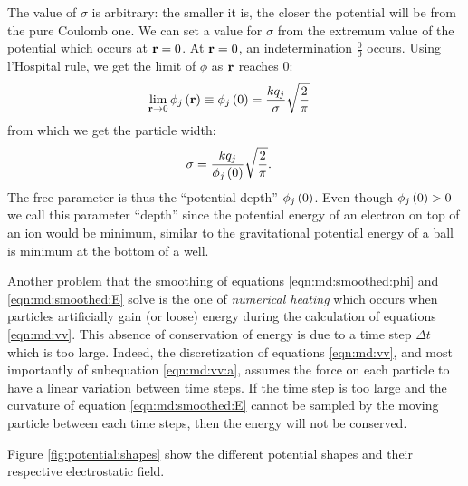 The value of $\sigma$ is arbitrary: the smaller it is, the closer the potential
will be from the pure Coulomb one. We can set a value for $\sigma$ from the
extremum value of the potential which occurs at $\textbf{r} = 0$. At $\textbf{r} = 0$, an
indetermination $\frac{0}{0}$ occurs. Using l'Hospital rule, we get the limit
of $\phi$ as $\textbf{r}$ reaches 0:
\begin{align}
\lim_{\textbf{r} \rightarrow 0} \phi_j\left( \textbf{r} \right)
    & \equiv \phi_j\left( 0 \right) = \frac{ k q_j }{ \sigma } \sqrt{\frac{2}{\pi}}
\end{align}
from which we get the particle width:
\begin{align}
\sigma & = \frac{ k q_j }{ \phi_j\left( 0 \right) } \sqrt{ \frac{2}{\pi}}.
\label{eqn:md:sigma}
\end{align}
The free parameter is thus the ``potential depth'' $\phi_j\left( 0 \right)$. Even
though $\phi_j\left( 0 \right) > 0$ we call this parameter ``depth'' since the potential
energy of an electron on top of an ion would be minimum, similar to the
gravitational potential energy of a ball is minimum at the bottom of a well.

Another problem that the smoothing of equations \eqref{eqn:md:smoothed:phi} and
\eqref{eqn:md:smoothed:E} solve is the one of \textit{numerical heating} which
occurs when particles artificially gain (or loose) energy during the
calculation of equations \eqref{eqn:md:vv}. This absence of conservation of
energy is due to a time step $\Delta t$ which is too large. Indeed, the
discretization of equations \eqref{eqn:md:vv}, and most importantly of
subequation \eqref{eqn:md:vv:a}, assumes the force on each particle to have a
linear variation between time steps. If the time step is too large and the
curvature of equation \eqref{eqn:md:smoothed:E} cannot be sampled by the moving
particle between each time steps, then the energy will not be conserved.



Figure \ref{fig:potential:shapes} show the different potential shapes and their
respective electrostatic field.

